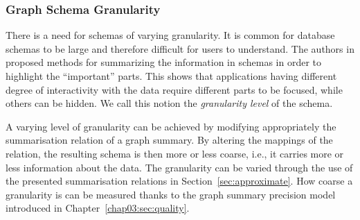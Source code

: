\subsubsection{Graph Schema Granularity}

There is a need for schemas of varying granularity. It is common for database schemas to be large and therefore difficult for users to understand. The authors in \cite{yu:2006:schema-summarization,yang:2011:summary-graphs} proposed methods for summarizing the information in schemas in order to highlight the ``important'' parts. This shows that applications having different degree of interactivity with the data require different parts to be focused, while others can be hidden. We call this notion the \emph{granularity level} of the schema.

A varying level of granularity can be achieved by modifying appropriately the summarisation relation of a graph summary. By altering the mappings of the relation, the resulting schema is then more or less coarse, i.e., it carries more or less information about the data. The granularity can be varied through the use of the presented summarisation relations in Section~\ref{sec:approximate}. How coarse a granularity is can be measured thanks to the graph summary precision model introduced in Chapter~\ref{chap03:sec:quality}.

